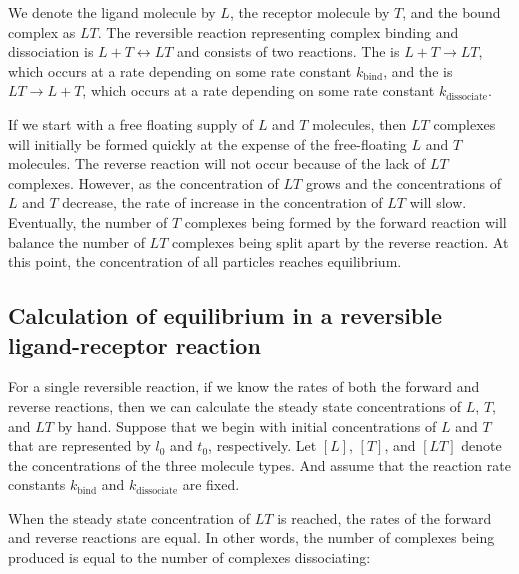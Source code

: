 \begin{note}\end{note}

We denote the ligand molecule by $L$, the receptor molecule by $T$, and the bound complex as $LT$. The reversible reaction representing complex binding and dissociation is $L + T \longleftrightarrow LT$ and consists of two reactions. The  is $L + T \rightarrow LT$, which occurs at a rate depending on some rate constant $k_\text{bind}$, and the  is $LT \rightarrow L + T$, which occurs at a rate depending on some rate constant $k_\text{dissociate}$.

If we start with a free floating supply of $L$ and $T$ molecules, then $LT$ complexes will initially be formed quickly at the expense of the free-floating $L$ and $T$ molecules. The reverse reaction will not occur because of the lack of $LT$ complexes. However, as the concentration of $LT$ grows and the concentrations of $L$ and $T$ decrease, the rate of increase in the concentration of $LT$ will slow. Eventually, the number of $T$ complexes being formed by the forward reaction will balance the number of $LT$ complexes being split apart by the reverse reaction. At this point, the concentration of all particles reaches equilibrium.

\FloatBarrier
{}
\subsection{Calculation of equilibrium in a reversible ligand-receptor reaction}

For a single reversible reaction, if we know the rates of both the forward and reverse reactions, then we can calculate the steady state concentrations of $L$, $T$, and $LT$ by hand.  Suppose that we begin with initial concentrations of $L$ and $T$ that are represented by $l_0$ and $t_0$, respectively. Let $[L]$, $[T]$, and $[LT]$ denote the concentrations of the three molecule types. And assume that the reaction rate constants $k_\text{bind}$ and $k_\text{dissociate}$ are fixed.

When the steady state concentration of $LT$ is reached, the rates of the forward and reverse reactions are equal. In other words, the number of complexes being produced is equal to the number of complexes dissociating:


